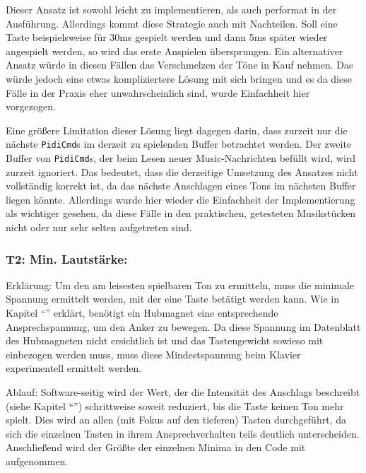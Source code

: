 Dieser Ansatz ist sowohl leicht zu implementieren, als auch performat in der Ausführung.
Allerdings kommt diese Strategie auch mit Nachteilen.
Soll eine Taste beispielsweise für 30ms gespielt werden und dann 5ms später wieder angespielt werden, so wird das erste Anspielen übersprungen.
Ein alternativer Ansatz würde in diesen Fällen das Verschmelzen der Töne in Kauf nehmen.
Das würde jedoch eine etwas kompliziertere Lösung mit sich bringen und es da diese Fälle in der Praxis eher unwahrscheinlich sind, wurde Einfachheit hier vorgezogen.

Eine größere Limitation dieser Lösung liegt dagegen darin, dass zurzeit nur die nächste \lstinline|PidiCmd|s im derzeit zu spielenden Buffer betrachtet werden.
Der zweite Buffer von \lstinline|PidiCmd|s, der beim Lesen neuer \ac{Music}-Nachrichten befüllt wird, wird zurzeit ignoriert.
Das bedeutet, dass die derzeitige Umsetzung des Ansatzes nicht vollständig korrekt ist, da das nächste Anschlagen eines Tons im nächsten Buffer liegen könnte.
Allerdings wurde hier wieder die Einfachheit der Implementierung als wichtiger gesehen, da diese Fälle in den praktischen, getesteten Musikstücken nicht oder nur sehr selten aufgetreten sind.


\subsubsection{T2: Min. Lautstärke:}

Erklärung: Um den am leisesten spielbaren Ton zu ermitteln, muss die minimale Spannung ermittelt werden, mit der eine Taste betätigt werden kann.
Wie in Kapitel \enquote{} erklärt, benötigt ein Hubmagnet eine entsprechende Ansprechspannung, um den Anker zu bewegen.
Da diese Spannung im Datenblatt des Hubmagneten nicht ersichtlich ist und das Tastengewicht sowieso mit einbezogen werden muss, muss diese Mindestspannung beim Klavier experimentell ermittelt werden.

Ablauf: Software-seitig wird der Wert, der die Intensität des Anschlags beschreibt (siehe Kapitel \enquote{}) schrittweise soweit reduziert, bis die Taste keinen Ton mehr spielt.
Dies wird an allen (mit Fokus auf den tieferen) Tasten durchgeführt, da sich die einzelnen Tasten in ihrem Ansprechverhalten teils deutlich unterscheiden. %
Anschließend wird der Größte der einzelnen Minima in den Code mit aufgenommen.

